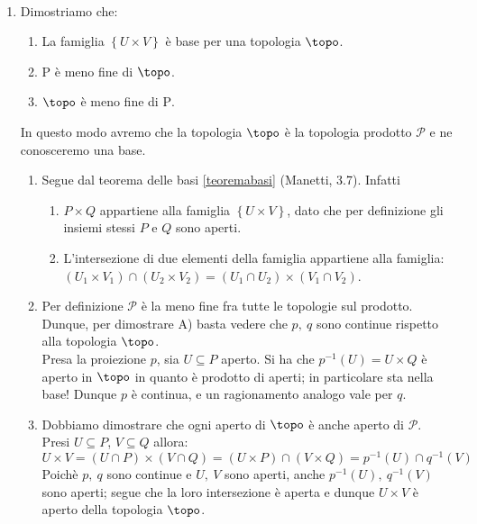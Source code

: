 \begin{demonstration}~{}
\begin{enumerate}[label=\Roman*]
\item Dimostriamo che:
\begin{enumerate}[label=\Alph*)]
\item La famiglia $\left\{U\times V\right\}$ è base per una topologia $\topo$.
\item $\mathrm{P}$ è meno fine di $\topo$.
\item $\topo$ è meno fine di $\mathrm{P}$.
\end{enumerate}
In questo modo avremo che la topologia $\topo$ è la topologia prodotto $\mathcal{P}$ e ne conosceremo una base.
\begin{enumerate}[label=\alph*)]
\item Segue dal teorema delle basi \ref{teoremabasi} (Manetti, 3.7). Infatti
\begin{enumerate}
\item $P\times Q$ appartiene alla famiglia $\left\{U\times V\right\}$, dato che per definizione gli insiemi stessi $P$ e $Q$ sono aperti.
\item L'intersezione di due elementi della famiglia appartiene alla famiglia:
$\left(U_1\times V_1\right)\cap\left(U_2\times V_2\right)=\left(U_1\cap U_2\right)\times \left(V_1\cap V_2\right)$.
\end{enumerate}
\item Per definizione $\mathcal{P}$ è la meno fine fra tutte le topologie sul prodotto. Dunque, per dimostrare A) basta vedere che $p,\ q$ sono continue rispetto alla topologia $\topo$.\\
Presa la proiezione $p$, sia $U\subseteq P$ aperto. Si ha che $p^{-1}\left(U\right)=U\times Q$ è aperto in $\topo$ in quanto è prodotto di aperti; in particolare sta nella base! Dunque $p$ è continua, e un ragionamento analogo vale per $q$.
\item Dobbiamo dimostrare che ogni aperto di $\topo$ è anche aperto di $\mathcal{P}$.\\
Presi $U\subseteq P$, $V\subseteq Q$ allora:
\begin{equation*}
U\times V=\left(U\cap P\right)\times\left(V\cap Q\right)=\left(U\times P\right)\cap \left(V\times Q\right)=p^{-1}\left(U\right)\cap q^{-1}\left(V\right)
\end{equation*}
Poichè $p,\ q$ sono continue e $U,\ V$ sono aperti, anche $p^{-1}\left(U\right),\ q^{-1}\left(V\right)$ sono aperti; segue che la loro intersezione è aperta e dunque $U\times V$ è aperto della topologia $\topo$.

\end{enumerate}
\end{enumerate}
\end{demonstration}

